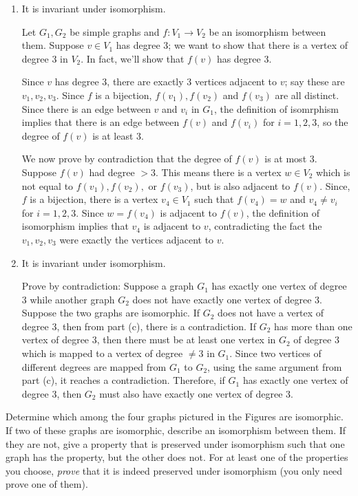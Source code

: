 \documentclass[12pt,twoside]{article}
\begin{document}
\begin{problem}{15}
{\begin{enumerate}
So, for example, let $G_1$ be a graph with a single vertex, 1, and $G_2$ be
a graph with a single vertex, 2. Obviously the two graphs are isomorphic, but
$G_1$ does not have vertices which are even integers.

\item
 It is invariant under isomorphism.

Let $G_1, G_2$ be simple graphs and $f:V_1\to V_2$ be an isomorphism
between them.  Suppose $v\in V_1$ has degree 3; we want to show that there
is a vertex of degree 3 in $V_2$.  In fact, we'll show that $f(v)$ has
degree 3.

Since $v$ has degree 3, there are exactly 3 vertices adjacent to $v$; say
these are $v_1,v_2,v_3$.  Since $f$ is a bijection, $f(v_1),f(v_2)$ and
$f(v_3)$ are all distinct.  Since there is an edge between $v$ and $v_i$
in $G_1$, the definition of isomrphism implies that there is an edge
between $f(v)$ and $f(v_i)$ for $i=1,2,3$, so the degree of $f(v)$ is at
least 3.

We now prove by contradiction that the degree of $f(v)$ is at most 3.
Suppose $f(v)$ had degree $>3$.  This means there is a vertex $w \in V_2$
which is not equal to $f(v_1), f(v_2),$ or $f(v_3)$, but is also adjacent
to $f(v)$.  Since, $f$ is a bijection, there is a vertex $v_4 \in V_1$
such that $f(v_4) = w$ and $v_4 \neq v_i$ for $i=1,2,3$.  Since $w=f(v_4)$
is adjacent to $f(v)$, the definition of isomorphism implies that $v_4$ is
adjacent to $v$, contradicting the fact the $v_1,v_2,v_3$ were exactly the
vertices adjacent to $v$.

\item
  It is invariant under isomorphism.

Prove by contradiction:  Suppose a graph $G_1$ has exactly one vertex of
degree $3$ while another graph $G_2$ does not have exactly one vertex of
degree 3. Suppose the two graphs are isomorphic. If $G_2$ does not have
a vertex of degree 3, then from part (c), there is a contradiction.
If $G_2$ has more than one vertex of degree 3, then there must
be at least one vertex in $G_2$ of degree 3 which is mapped to
a vertex of degree $\neq 3$ in $G_1$. Since two vertices of different degrees
are mapped from $G_1$ to $G_2$, using the same argument from part (c),
it reaches a contradiction. Therefore, if $G_1$ has exactly one
vertex of degree 3, then $G_2$ must also have exactly one
vertex of degree 3.

\end{enumerate}

}
 Determine which among the four graphs pictured in the Figures
are isomorphic.  If two of these graphs are isomorphic, describe an
isomorphism between them.  If they are not, give a property that is
preserved under isomorphism such that one graph has the property, but the
other does not.  For at least one of the properties you choose,
\emph{prove} that it is indeed preserved under isomorphism (you only need
prove one of them).


\end{problem}
\end{document}
